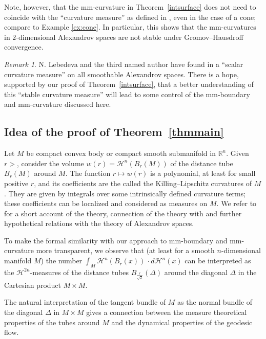 \documentclass[12pt,leqno,intlimits]{amsart}
\numberwithin{equation}{section}
\theoremstyle{definition}
\theoremstyle{remark}
\newtheorem{rem}[thm]{Remark}
\newcommand{\tref}[1]{Theorem~\ref{#1}}
\newcommand{\R}{\mathbb{R}}
\begin{document}
Note, however, that the mm-curvature
in \tref{intsurface} does not need to coincide with the ``curvature measure'' as  defined in \cite{AZ}, even in the case of a cone; compare to Example \ref{ex:cone}.
In particular, this shows that the mm-curvatures in $2$-dimensional Alexandrov spaces are not stable under Gromov--Hausdroff convergence.


\begin{rem}
N. Lebedeva and the third named author have found in \cite{LP}  a ``scalar curvature measure'' on all smoothable Alexandrov spaces.
There is a hope, supported by our proof of  \tref{intsurface}, that a better understanding of this ``stable curvature measure'' will
lead to some control of the   mm-boundary and mm-curvature discussed here.   
\end{rem}



\subsection{Idea of the proof of \tref{thmmain}}
Let $M$ be compact convex body or compact smooth submanifold in $\R^n$. 
Given $r>$, consider the volume $w(r)=\mathcal H^n (B_r(M))$ of the distance tube $B_r(M)$ around $M$. 
The function $r\mapsto w(r)$ is a polynomial, at least for small positive $r$, and its coefficients are the called the Killing--Lipschitz curvatures of $M$.
They are given by  integrals over some intrinsically defined curvature terms; 
these coefficients can be localized and considered as measures on $M$.
We refer  to \cite{Alesker} for a short account of the theory, connection of the theory with 
\cite{LP} and further hypothetical relations with the theory of Alexandrov spaces. 

To make the formal similarity with our approach  to mm-boundary and mm-curvature more transparent, we observe that
(at least for a smooth $n$-dimensional manifold $M$) the number   $\int _M \mathcal H^n  (B_r(x))\, \cdot  d\mathcal H^n (x)$  can be interpreted as the $\mathcal H^{2n}$-measures
of the distance tubes $B_{\frac r {\sqrt 2} } (\Delta )$ around the diagonal $\Delta $ in the Cartesian product $M\times M$.

The natural interpretation of the tangent bundle of $M$ as the normal  bundle of the diagonal $\Delta$ in $M\times M$ gives a connection between
the measure theoretical properties of the tubes around $M$ and the dynamical properties of the geodesic flow.
\end{document}
